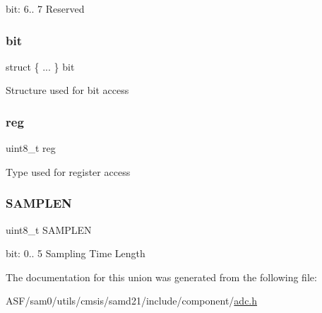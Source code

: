 bit\+: 6.. 7 Reserved \mbox{\label{union_a_d_c___s_a_m_p_c_t_r_l___type_a383c0f732ac9988a1ae4c4e649468d01}} 
\subsubsection{\texorpdfstring{bit}{bit}}
{\footnotesize\ttfamily struct \{ ... \}   bit}

Structure used for bit access \mbox{\label{union_a_d_c___s_a_m_p_c_t_r_l___type_a9428adc9af4653a2050e2536b55dec8d}} 
\subsubsection{\texorpdfstring{reg}{reg}}
{\footnotesize\ttfamily uint8\+\_\+t reg}

Type used for register access \mbox{\label{union_a_d_c___s_a_m_p_c_t_r_l___type_a50450a83d6834605e4e113ece0ab9aad}} 
\subsubsection{\texorpdfstring{SAMPLEN}{SAMPLEN}}
{\footnotesize\ttfamily uint8\+\_\+t S\+A\+M\+P\+L\+EN}

bit\+: 0.. 5 Sampling Time Length 

The documentation for this union was generated from the following file\+:\begin{DoxyCompactItemize}
\item 
A\+S\+F/sam0/utils/cmsis/samd21/include/component/\mbox{\hyperlink{component_2adc_8h}{adc.\+h}}\end{DoxyCompactItemize}
